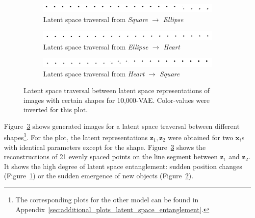 \begin{figure}
    \centering
    \begin{subfigure}{\textwidth}
        \centering
        \includegraphics[width=\textwidth]{images/latent_space_entanglement/vae_10000_traverse_square_ellipse.png}
        \caption{Latent space traversal from \textit{Square} $\rightarrow$ \textit{Ellipse}}
        \label{subfig:10000_vae_latent_space_traversal_square_to_ellipse}
    \end{subfigure}
    \begin{subfigure}{\textwidth}
        \centering
        \includegraphics[width=\textwidth]{images/latent_space_entanglement/vae_10000_traverse_ellipse_heart.png}
        \caption{Latent space traversal from \textit{Ellipse} $\rightarrow$ \textit{Heart}}
    \end{subfigure}
    \begin{subfigure}{\textwidth}
        \centering
        \includegraphics[width=\textwidth]{images/latent_space_entanglement/vae_10000_traverse_heart_square.png}
        \caption{Latent space traversal from \textit{Heart} $\rightarrow$ \textit{Square}}
        \label{subfig:10000_vae_latent_space_traversal_heart_to_square}
    \end{subfigure}
    \caption[VAE Latent Space Traversal - dSprites]{Latent space traversal between latent space representations of images with certain shapes for 10,000-\ac{VAE}. Color-values were inverted for this plot.}
    \label{fig:10000_vae_latent_space_traversal_shape_to_shape}
\end{figure}

Figure~\ref{fig:10000_vae_latent_space_traversal_shape_to_shape} shows generated images for a latent space traversal between different shapes\footnote{The corresponding plots for the other model can be found in Appendix~\ref{sec:additional_plots_latent_space_entanglement}.}.
For the plot, the latent representations $\bm{z}_1, \bm{z}_2$ were obtained for two $\bm{x}_i$s with identical parameters except for the shape.
Figure~\ref{fig:10000_vae_latent_space_traversal_shape_to_shape} shows the reconstructions of 21 evenly spaced points on the line segment between $\bm{z}_1$ and $\bm{z}_2$.
It shows the high degree of latent space entanglement: sudden position changes (Figure~\ref{subfig:10000_vae_latent_space_traversal_square_to_ellipse}) or the sudden emergence of new objects (Figure~\ref{subfig:10000_vae_latent_space_traversal_heart_to_square}).

